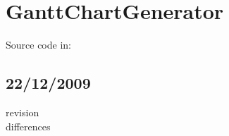 \section{GanttChartGenerator}
Source code in:
\subsection{22/12/2009}
\begin{description}
\item[revision]
\item[differences]
\end{description}